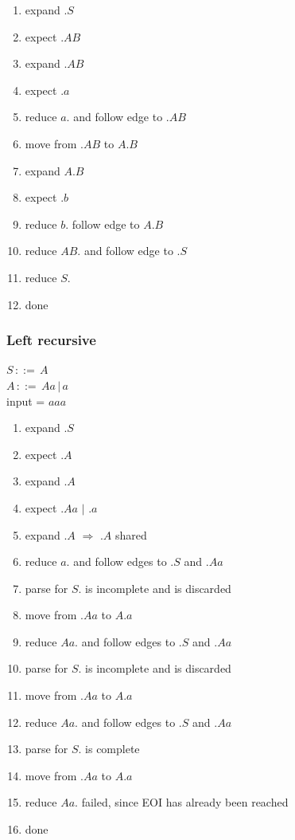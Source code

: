 \documentclass[a4paper,10pt]{article}
\begin{document}
\begin{enumerate}
 \setlength{\itemsep}{0pt}
 \setlength{\parskip}{0pt}
 \setlength{\parsep}{0pt}
 
 \item expand $.S$
 \item expect $.AB$
 \item expand $.AB$
 \item expect $.a$
 \item reduce $a.$ and follow edge to $.AB$
 \item move from $.AB$ to $A.B$
 \item expand $A.B$
 \item expect $.b$
 \item reduce $b.$ follow edge to $A.B$
 \item reduce $AB.$ and follow edge to $.S$
 \item reduce $S.$
 \item done
\end{enumerate}

\subsubsection{Left recursive}
$S\,::=\,A$\\
$A\,::=\,Aa\,|\,a$\\
input = $aaa$

\begin{enumerate}
 \setlength{\itemsep}{0pt}
 \setlength{\parskip}{0pt}
 \setlength{\parsep}{0pt}
 
 \item expand $.S$
 \item expect $.A$
 \item expand $.A$
 \item expect $.Aa$ $|$ $.a$
 \item expand $.A$ $\Rightarrow$ $.A$ shared
 \item reduce $a.$ and follow edges to $.S$ and $.Aa$
 \item parse for $S.$ is incomplete and is discarded
 \item move from $.Aa$ to $A.a$
 \item reduce $Aa.$ and follow edges to $.S$ and $.Aa$
 \item parse for $S.$ is incomplete and is discarded
 \item move from $.Aa$ to $A.a$
 \item reduce $Aa.$ and follow edges to $.S$ and $.Aa$
 \item parse for $S.$ is complete
 \item move from $.Aa$ to $A.a$
 \item reduce $Aa.$ failed, since EOI has already been reached
 \item done
\end{enumerate}
\end{document}
